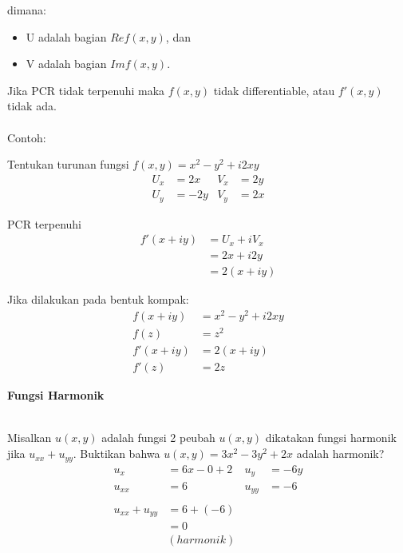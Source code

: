 \documentclass{article}
\begin{document}
dimana:
\begin{itemize}
    \item U adalah bagian $Re f(x,y)$, dan
    \item V adalah bagian $Im f(x,y)$.
\end{itemize}

Jika PCR tidak terpenuhi maka $f(x,y)$ tidak differentiable, atau $f'(x,y)$ tidak ada.
\leavevmode\\ \\

Contoh:

Tentukan turunan fungsi $f(x,y) = x^2 -y^2 + i2xy$
\begin{align}
    U_x & = 2x  & V_x & = 2y
    \nonumber                \\
    U_y & = -2y & V_y & = 2x
    \nonumber
\end{align}

PCR terpenuhi
\begin{align}
    f'(x+iy) & = U_x +iV_x
    \nonumber              \\
             & = 2x +i2y
    \nonumber              \\
             & = 2(x+iy)
    \nonumber
\end{align}

Jika dilakukan pada bentuk kompak:
\begin{align}
    f(x+iy)  & = x^2 -y^2 + i2xy
    \nonumber                    \\
    f(z)     & = z^2
    \nonumber                    \\
    f'(x+iy) & = 2(x+iy)
    \nonumber                    \\
    f'(z)    & = 2z
    \nonumber
\end{align}



\newpage
\begin{center}
    \textbf{Fungsi Harmonik}
\end{center}
\leavevmode\\

Misalkan $u(x,y)$ adalah fungsi 2 peubah $u(x,y)$ dikatakan fungsi harmonik jika $u_{xx} + u_{yy}$. Buktikan bahwa $u(x,y) = 3x^2 - 3y^2 + 2x$ adalah harmonik?
\begin{align}
    u_x             & = 6x-0+2   & u_y    & = -6y
    \nonumber                                     \\
    u_{xx}          & = 6        & u_{yy} & = -6
    \nonumber                                     \\
    \nonumber                                     \\
    u_{xx} + u_{yy} & = 6 + (-6)
    \nonumber                                     \\
                    & = 0
    \nonumber                                     \\
                    & (harmonik)
    \nonumber
\end{align}
\end{document}
